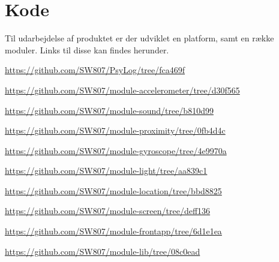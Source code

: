 \chapter{Kode}\label{app:kode}
Til udarbejdelse af produktet er der udviklet en platform, samt en række moduler.
Links til disse kan findes herunder.

\begin{description}[style=nextline]
	\item[PsyLog] \url{https://github.com/SW807/PsyLog/tree/fca469f}
	\item[module-accelerometer] \url{https://github.com/SW807/module-accelerometer/tree/d30f565}
	\item[module-sound] \url{https://github.com/SW807/module-sound/tree/b810d99}
	\item[module-proximity] \url{https://github.com/SW807/module-proximity/tree/0fb4d4c}
	\item[module-gyroscope] \url{https://github.com/SW807/module-gyroscope/tree/4e9970a}
	\item[module-light] \url{https://github.com/SW807/module-light/tree/aa839c1}
	\item[module-location] \url{https://github.com/SW807/module-location/tree/bbd8825}
	\item[module-screen] \url{https://github.com/SW807/module-screen/tree/deff136}
	\item[module-frontapp] \url{https://github.com/SW807/module-frontapp/tree/6d1e1ea}
	\item[module-lib] \url{https://github.com/SW807/module-lib/tree/08c0ead}
\end{description}